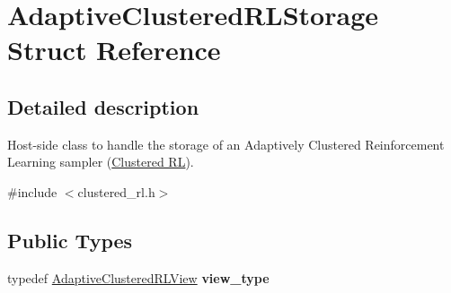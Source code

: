 \hypertarget{struct_adaptive_clustered_r_l_storage}{}\section{Adaptive\+Clustered\+R\+L\+Storage Struct Reference}
\label{struct_adaptive_clustered_r_l_storage}


\subsection{Detailed description}
Host-\/side class to handle the storage of an Adaptively Clustered Reinforcement Learning sampler (\hyperlink{group___clustered_r_l_module}{Clustered RL}). 

{\ttfamily \#include $<$clustered\+\_\+rl.\+h$>$}

\subsection*{Public Types}
\begin{DoxyCompactItemize}
\item 
\mbox{\label{struct_adaptive_clustered_r_l_storage_a4c7593874d92f994b70b2f663fdb4d1c}} 
typedef \hyperlink{struct_adaptive_clustered_r_l_view}{Adaptive\+Clustered\+R\+L\+View} {\bfseries view\+\_\+type}
\end{DoxyCompactItemize}

